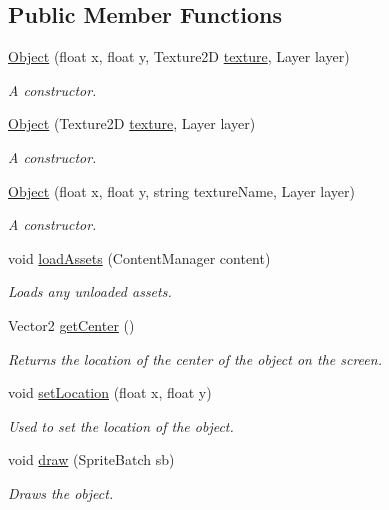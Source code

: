 \subsection*{Public Member Functions}
\begin{DoxyCompactItemize}
\item 
\hyperlink{classwp__engine_1_1_object_a76308a1799d3e2a26da8cfbce0ab608e}{Object} (float x, float y, Texture2\-D \hyperlink{classwp__engine_1_1_object_a5aebe29df25c51280d462cab63733c98}{texture}, Layer layer)
\begin{DoxyCompactList}\small\item\em A constructor. \end{DoxyCompactList}\item 
\hyperlink{classwp__engine_1_1_object_ac41bd1d0ab2e99dd6de7e062bf2f5342}{Object} (Texture2\-D \hyperlink{classwp__engine_1_1_object_a5aebe29df25c51280d462cab63733c98}{texture}, Layer layer)
\begin{DoxyCompactList}\small\item\em A constructor. \end{DoxyCompactList}\item 
\hyperlink{classwp__engine_1_1_object_a0a364d6b59424f160dfbe81b60ecf138}{Object} (float x, float y, string texture\-Name, Layer layer)
\begin{DoxyCompactList}\small\item\em A constructor. \end{DoxyCompactList}\item 
void \hyperlink{classwp__engine_1_1_object_a7bec0bf1aadb96c3c4c570d0bc236738}{load\-Assets} (Content\-Manager content)
\begin{DoxyCompactList}\small\item\em Loads any unloaded assets. \end{DoxyCompactList}\item 
Vector2 \hyperlink{classwp__engine_1_1_object_a848ea6861e5132837e49a3171d1f885a}{get\-Center} ()
\begin{DoxyCompactList}\small\item\em Returns the location of the center of the object on the screen. \end{DoxyCompactList}\item 
void \hyperlink{classwp__engine_1_1_object_a8ae28b3c127cde23d39a2fec33dd910b}{set\-Location} (float x, float y)
\begin{DoxyCompactList}\small\item\em Used to set the location of the object. \end{DoxyCompactList}\item 
void \hyperlink{classwp__engine_1_1_object_ada86fb0b40d9232c839ce6d073023397}{draw} (Sprite\-Batch sb)
\begin{DoxyCompactList}\small\item\em Draws the object. \end{DoxyCompactList}\end{DoxyCompactItemize}
